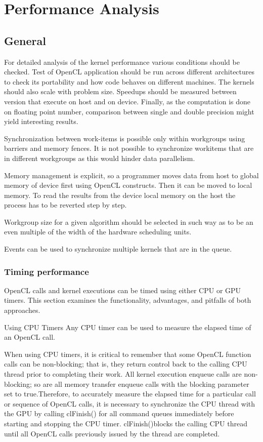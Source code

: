 \chapter{Performance Analysis}
\section{General}
For detailed analysis of the kernel performance various conditions should be checked. Test of OpenCL application should be run across different architectures to check its portability and how code behaves on different machines. The kernels should also scale with problem size. Speedups should be measured between version that execute on host and on device. Finally, as the computation is done on floating point number, comparison between single and double precision might yield interesting results.

Synchronization between work-items is possible only within workgroups using barriers and memory fences. It is not possible to synchronize workitems that are in different workgroups as this would hinder data parallelism.

Memory management is explicit, so a programmer moves data from host to global memory of device first using OpenCL constructs. Then it can be moved to local memory. To read the results from the device local memory on the host the process has to be reverted step by step.

Workgroup size for a given algorithm should be selected in such way as to be an even multiple of the width of the hardware scheduling units.

Events can be used to synchronize multiple kernels that are in the queue.
			

\subsection{Timing performance}
OpenCL calls and kernel executions can be timed using either CPU or GPU timers. This section examines the functionality, advantages, and pitfalls of both approaches.\cite{nvidia2009openclbest}

Using CPU Timers
Any CPU timer can be used to measure the elapsed time of an OpenCL call. \cite{nvidia2009openclbest}

When using CPU timers, it is critical to remember that some OpenCL function calls can be non-blocking; that is, they return control back to the calling CPU thread prior to completing their work. All kernel execution enqueue calls are non-blocking; so are all memory transfer enqueue calls with the blocking parameter set to true.Therefore, to accurately measure the elapsed time for a particular call or sequence of OpenCL calls, it is necessary to synchronize the CPU thread with the GPU by calling clFinish() for all command queues immediately before starting and stopping the CPU timer. clFinish()blocks the calling CPU thread until all OpenCL calls previously issued by the thread are completed.\cite{nvidia2009openclbest}

